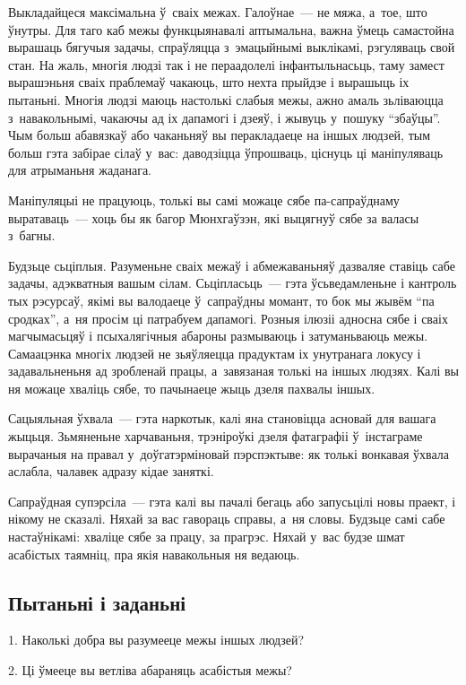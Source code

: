 Выкладайцеся максімальна ў~сваіх межах. Галоўнае~--- не мяжа, а~тое, што ўнутры. Для таго каб межы функцыянавалі аптымальна, важна ўмець самастойна вырашаць бягучыя задачы, спраўляцца з~эмацыйнымі выклікамі, рэгуляваць свой стан. На жаль, многія людзі так і не пераадолелі інфантыльнасьць, таму замест вырашэньня сваіх праблемаў чакаюць, што нехта прыйдзе і вырашыць іх пытаньні. Многія людзі маюць настолькі слабыя межы, ажно амаль зьліваюцца з~навакольнымі, чакаючы ад іх дапамогі і дзеяў, і жывуць у~пошуку ``збаўцы''. Чым больш абавязкаў або чаканьняў вы перакладаеце на іншых людзей, тым больш гэта забірае сілаў у~вас: даводзіцца ўпрошваць, ціснуць ці маніпуляваць для атрыманьня жаданага.

Маніпуляцыі не працуюць, толькі вы самі можаце сябе па-сапраўднаму выратаваць~--- хоць бы як багор Мюнхгаўзэн, які выцягнуў сябе за валасы з~багны.

Будзьце сьціплыя. Разуменьне сваіх межаў і абмежаваньняў дазваляе ставіць сабе задачы, адэкватныя вашым сілам. Сьціпласьць~--- гэта ўсьведамленьне і кантроль тых рэсурсаў, якімі вы валодаеце ў~сапраўдны момант, то бок мы жывём ``па сродках'', а~ня просім ці патрабуем дапамогі. Розныя ілюзіі адносна сябе і сваіх магчымасьцяў і псыхалягічныя абароны размываюць і затуманьваюць межы. Самаацэнка многіх людзей не зьяўляецца прадуктам іх унутранага локусу і задавальненьня ад зробленай працы, а~завязаная толькі на іншых людзях. Калі вы ня можаце хваліць сябе, то пачынаеце жыць дзеля пахвалы іншых. 

Сацыяльная ўхвала~--- гэта наркотык, калі яна становіцца асновай для вашага жыцьця. Зьмяненьне харчаваньня, трэніроўкі дзеля фатаграфіі ў~інстаграме вырачаныя на правал у~доўгатэрміновай пэрспэктыве: як толькі вонкавая ўхвала аслабла, чалавек адразу кідае заняткі. 

Сапраўдная супэрсіла~--- гэта калі вы пачалі бегаць або запусьцілі новы праект, і нікому не сказалі. Няхай за вас гавораць справы, а~ня словы. Будзьце самі сабе настаўнікамі: хваліце сябе за працу, за прагрэс. Няхай у~вас будзе шмат асабістых таямніц, пра якія навакольныя ня ведаюць. 

\subsection*{Пытаньні і заданьні}

1. Наколькі добра вы разумееце межы іншых людзей?

2. Ці ўмееце вы ветліва абараняць асабістыя межы?

